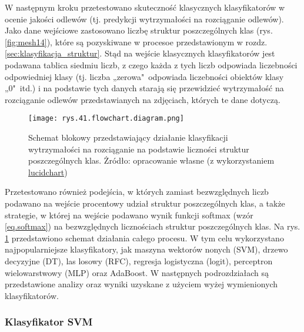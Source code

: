 W następnym kroku przetestowano skuteczność klasycznych klasyfikatorów w ocenie jakości odlewów (tj. predykcji wytrzymałości na rozciąganie odlewów). Jako dane wejściowe zastosowano liczbę struktur poszczególnych klas (rys. \ref{fig:mesh14}), które są pozyskiwane w procesoe przedstawionym w rozdz. \ref{sec:klasyfikacja_struktur}. Stąd na wejście klasycznych klasyfikatorów jest podawana tablica siedmiu liczb, z czego każda z tych liczb odpowiada liczebności odpowiedniej klasy (tj. liczba „zerowa"~odpowiada liczebności obiektów klasy „0"~itd.) i na podstawie tych danych starają się przewidzieć wytrzymałość na rozciąganie odlewów przedstawianych na zdjęciach, których te dane dotyczą. 
\begin{figure}[h]
    \centering
    \texttt{[image: rys.41.flowchart.diagram.png]}
    \caption{Schemat blokowy przedstawiający działanie klasyfikacji wytrzymałości na rozciąganie na podstawie liczności struktur poszczególnych klas. Żródło: opracowanie własne (z wykorzystaniem \href{https://www.lucidchart.com}{lucidchart})}
    \label{rys.41.flowchart.diagram.png}
\end{figure}
Przetestowano również podejścia, w których zamiast bezwzględnych liczb podawano na wejście procentowy udział struktur poszczególnych klas, a także strategie, w której na wejście podawano wynik funkcji softmax (wzór \ref{eq.softmax}) na bezwzględnych licznościach struktur poszczególnych klas. Na rys. \ref{rys.41.flowchart.diagram.png} przedstawiono schemat działania całego procesu.
W tym celu wykorzystano najpopularniejsze klasyfikatory, jak maszyna wektorów nonych (SVM), drzewo decyzyjne (DT), las losowy (RFC), regresja logistyczna (logit), perceptron wielowarstwowy (MLP) oraz AdaBoost. W następnych podrozdziałach są przedstawione analizy oraz wyniki uzyskane z użyciem wyżej wymienionych klasyfikatorów.

\subsubsection{Klasyfikator SVM}
\label{structures.with.svm}

